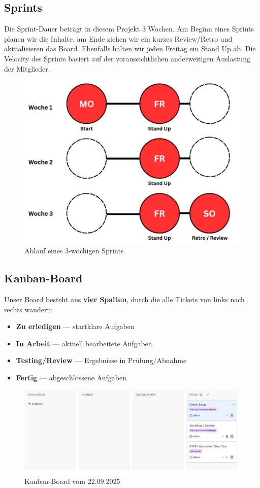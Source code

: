 \documentclass{article}
\begin{document}
\subsection{Sprints}
Die Sprint-Dauer beträgt in diesem Projekt 3 Wochen. Am Beginn eines Sprints planen wir die Inhalte, am Ende ziehen wir ein kurzes Review/Retro und aktualisieren das Board. Ebenfalls halten wir jeden Freitag ein Stand Up ab. Die Velocity des Sprints basiert auf der voraussichtlichen anderweitigen Auslastung der Mitglieder. 

\begin{figure}[H] 
  \centering
  \includegraphics[width=0.85\linewidth]{Sprint_Zyklus.png}
  \caption{Ablauf eines 3-wöchigen Sprints}
  \label{fig:sprint-ablauf}
\end{figure}

\subsection{Kanban-Board}
Unser Board besteht aus \textbf{vier Spalten}, durch die alle Tickets von links nach rechts wandern:
\begin{itemize}[nosep]
  \item \textbf{Zu erledigen} — startklare Aufgaben
  \item \textbf{In Arbeit} — aktuell bearbeitete Aufgaben
  \item \textbf{Testing/Review} — Ergebnisse in Prüfung/Abnahme
  \item \textbf{Fertig} — abgeschlossene Aufgaben
\end{itemize}




\begin{figure}[H]
  \centering
  \includegraphics[width=\textwidth]{Kanban_Board_1_Sprint.png}
  \caption{Kanban-Board vom 22.09.2025}
  \label{fig:kanban-board-1-sprint}
\end{figure}
\end{document}
